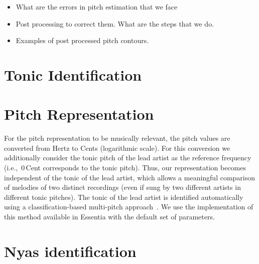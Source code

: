 \begin{itemize}
	\item What are the errors in pitch estimation that we face
	\item Post processing to correct them. What are the steps that we do.
	\item Examples of post processed pitch contours.
\end{itemize}

\section{Tonic Identification}


\section{Pitch Representation} 

For the pitch representation to be musically relevant, the pitch values are converted from Hertz to Cents (logarithmic scale). For this conversion we additionally consider the tonic pitch of the lead artist as the reference frequency (i.e.,~0\,Cent corresponds to the tonic pitch). Thus, our representation becomes independent of the tonic of the lead artist, which allows a meaningful comparison of melodies of two distinct recordings (even if sung by two different artists in different tonic pitches). The tonic of the lead artist is identified automatically using a classification-based multi-pitch approach~\cite{Gulati2014Tonic}. We use the implementation of this method available in Essentia with the default set of parameters.%


\section{Nyas identification}




